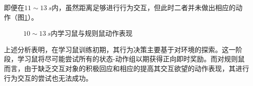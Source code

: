 即便在$11\sim13~s$内，虽然距离足够进行行为交互，但此时二者并未做出相应的动作（图\ref{figure_start10-13}）。
\begin{figure}[htbp]
  \vspace{13pt}
  \centering
  \caption{$10\sim13~s$内学习鼠与规则鼠动作表现}\label{figure_start10-13}
\end{figure}

上述分析表明，在学习鼠训练初期，其行为决策主要基于对环境的探索。这一阶段，学习鼠将尽可能尝试所有的状态-动作组以期获得正向即时奖励。而对规则鼠而言，由于缺乏交互对象的积极回应和相应的提高其交互欲望的动作表现，其进行行为交互的尝试也无法成功。

